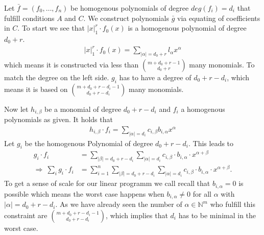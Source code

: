 \documentclass[./main.tex]{subfiles}
\begin{document}
Let $\bar f = (f_0,\dots,f_n)$ be homogenous polynomials of degree $deg(f_i) = d_i$  that fulfill conditions $A$ and $C$. We construct polynomials $\bar g$ via equating of coefficients in $C$. To start we see that $\vert x \vert_1^r \cdot f_0(x)$ is a homogenous polynomial of degree $d_0+r$.
\begin{align*}
\vert x \vert_1^r \cdot f_0(x) = \sum_{\vert \alpha \vert = d_0+r} l_\alpha x^\alpha
\end{align*}
which means it is constructed via less than $\binom{m+ d_0+r -1 }{d_0+r}$ many monomials. To match the degree on the left side. $g_i$ has to have a degree of $d_0+r-d_i$, which means it is based on $ \binom {m + d_0+r-d_i-1} {d_0+r-d_i}$ many monomials.

Now let $h_{i,\beta}$ be a monomial of degree $d_0+r-d_i$ and $f_i$ a homogenous polynomials as given. It holds that
\begin{align*}
h_{i,\beta} \cdot f_i = \sum_{\vert \alpha \vert = d_i} c_{i,\beta} b_{i,\alpha} x^\alpha
\end{align*}
Let $g_i$ be the homogenous Polynomial of degree $d_0+r-d_i$. This leads to
\begin{align*}
g_i \cdot f_i &= \sum_{\vert \beta \vert = d_0+r-d_i}  \sum_{\vert \alpha \vert = d_i} c_{i,\beta} \cdot b_{i,\alpha} \cdot x^{\alpha+\beta}\\
\Rightarrow \ \sum_i g_i \cdot f_i &=  \sum_{i=1}^n \sum_{\vert \beta \vert = d_0+r-d_i}  \sum_{\vert \alpha \vert = d_i} c_{i,\beta} \cdot b_{i,\alpha} \cdot x^{\alpha+\beta}.
\end{align*}
To get a sense of scale for our linear programm we call recall that $b_{i,\alpha} = 0 $ is possible which means the worst case happens when  $b_{i,\alpha} \neq 0 $ for all $\alpha$ with $\vert \alpha \vert = d_0+r -d_i$. As we have already seen the number of $\alpha\in \mathbb{N}^m$ who fulfill this constraint are $ \binom {m +d_0+r -d_i -1 } {d_0+r -d_i}$,  which implies that $d_i$ has to be minimal in the worst case.
\end{document}
